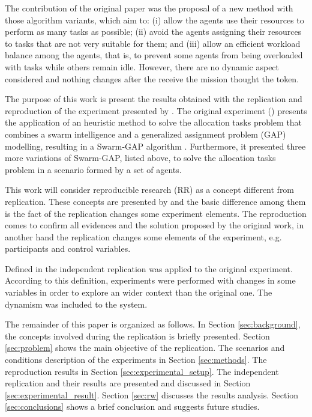 The contribution of the original paper was the proposal of a new method with those algorithm variants, which aim to: (i) allow the agents use their resources to perform as many tasks as possible; (ii) avoid the agents assigning their resources to tasks that are not very suitable for them; and (iii) allow an efficient workload balance among the agents, that is, to prevent some agents from being overloaded with tasks while others remain idle. However, there are no dynamic aspect considered and nothing changes after the \uavs receive the mission thought the token.

The purpose of this work is present the results obtained with the replication and reproduction of the experiment presented by \cite{MAS07}. The original experiment (\cite{MAS07}) presents the application of an heuristic method to solve the allocation tasks problem that combines a swarm intelligence and a generalized assignment problem (GAP) modelling, resulting in a Swarm-GAP algorithm \cite{ferreira2007swarm}. Furthermore, it presented three more variations of Swarm-GAP, listed above, to solve the allocation tasks problem in a scenario formed by a set of agents.

This work will consider reproducible research (RR) as a concept different from replication. These concepts are presented by \cite{exp02} and the basic difference among them is the fact of the replication changes some experiment elements. The reproduction comes to confirm all evidences and the solution proposed by the original work, in another hand the replication changes some elements of the experiment, e.g. participants and control variables.

Defined in \cite{exp03} the independent replication was applied to the original experiment. According to this definition, experiments were performed with changes in some variables in order to explore an wider context than the original one.  The dynamism was included to the system. 

The remainder of this paper is organized as follows. In Section \ref{sec:background}, the concepts involved during the replication is briefly  presented. Section \ref{sec:problem} shows the main objective of the replication. The scenarios and conditions description of the experiments in Section \ref{sec:methods}. The reproduction results in Section \ref{sec:experimental_setup}. The independent replication and their results are presented and discussed in Section \ref{sec:experimental_result}. Section \ref{sec:rw} discusses the results analysis. Section \ref{sec:conclusions} shows a brief conclusion and suggests future studies.
